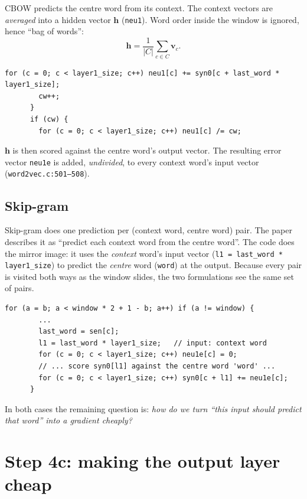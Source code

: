 \documentclass[11pt,a4paper]{article}
\newcommand{\code}[1]{\texttt{#1}}
\newcommand{\src}[1]{\texttt{word2vec.c:#1}}
\newcommand{\vin}{\mathbf{v}}
\begin{document}
CBOW predicts the centre word from its context. The context vectors are
\emph{averaged} into a hidden vector $\mathbf{h}$ (\code{neu1}). Word order inside
the window is ignored, hence ``bag of words'':
\[
  \mathbf{h} = \frac{1}{|C|}\sum_{c\in C}\vin_c .
\]
\begin{lstlisting}[firstnumber=459]
        for (c = 0; c < layer1_size; c++) neu1[c] += syn0[c + last_word * layer1_size];
        cw++;
      }
      if (cw) {
        for (c = 0; c < layer1_size; c++) neu1[c] /= cw;
\end{lstlisting}
$\mathbf{h}$ is then scored against the centre word's output vector. The resulting
error vector \code{neu1e} is added, \emph{undivided}, to every context word's input
vector (\src{501--508}).

\subsection{Skip-gram}

Skip-gram does one prediction per (context word, centre word) pair. The paper
describes it as ``predict each context word from the centre word''. The code does the
mirror image: it uses the \emph{context} word's input vector (\code{l1 = last\_word
* layer1\_size}) to predict the \emph{centre} word (\code{word}) at the output.
Because every pair is visited both ways as the window slides, the two formulations
see the same set of pairs.

\begin{lstlisting}[firstnumber=511]
      for (a = b; a < window * 2 + 1 - b; a++) if (a != window) {
        ...
        last_word = sen[c];
        l1 = last_word * layer1_size;   // input: context word
        for (c = 0; c < layer1_size; c++) neu1e[c] = 0;
        // ... score syn0[l1] against the centre word 'word' ...
        for (c = 0; c < layer1_size; c++) syn0[c + l1] += neu1e[c];
      }
\end{lstlisting}

In both cases the remaining question is: \emph{how do we turn ``this input should
predict that word'' into a gradient cheaply?}

\section{Step 4c: making the output layer cheap}
\end{document}

